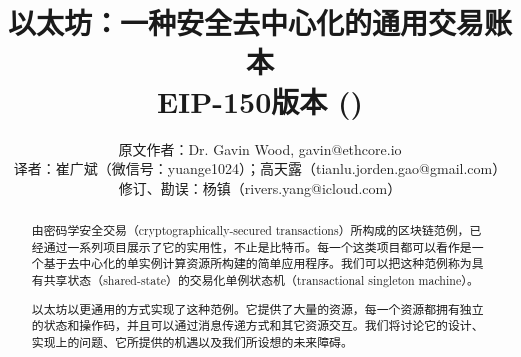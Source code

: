 \documentclass[9pt,oneside]{amsart}
\title{以太坊：一种安全去中心化的通用交易账本 \\ {\smaller \textbf{EIP-150版本 (\YellowPaperVersionNumber{})}}}
\author{
    原文作者：Dr. Gavin Wood, gavin@ethcore.io\\
    译者：崔广斌（微信号：yuange1024）；高天露（tianlu.jorden.gao@gmail.com）
    修订、勘误：杨镇（rivers.yang@icloud.com）
}
\begin{document}
\pagecolor{lightyellow}

\begin{abstract}
由密码学安全交易（cryptographically-secured transactions）所构成的区块链范例，已经通过一系列项目展示了它的实用性，不止是比特币。每一个这类项目都可以看作是一个基于去中心化的单实例计算资源所构建的简单应用程序。我们可以把这种范例称为具有共享状态（shared-state）的交易化单例状态机（transactional singleton machine）。

以太坊以更通用的方式实现了这种范例。它提供了大量的资源，每一个资源都拥有独立的状态和操作码，并且可以通过消息传递方式和其它资源交互。我们将讨论它的设计、实现上的问题、它所提供的机遇以及我们所设想的未来障碍。
\end{abstract}

\maketitle
\end{document}
